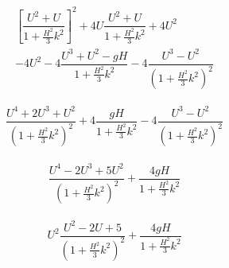 \documentclass[12pt]{article}
\begin{document}
\begin{align}
\left[\dfrac{U^2 + U}{1  + \frac{H^2}{3}k^2}\right]^2 + 4U \dfrac{U^2 + U}{1  + \frac{H^2}{3}k^2} + 4U^2 \\ -4 U^2 -4  \dfrac{U^3 + U^2 - gH}{1  + \frac{H^2}{3}k^2} - 4\dfrac{U^3 - U^2}{\left(1  + \frac{H^2}{3}k^2\right)^2} 
\end{align}


\begin{align}
\dfrac{U^4 + 2U^3 + U^2}{\left(1  + \frac{H^2}{3}k^2\right)^2}  +4  \dfrac{gH}{1  + \frac{H^2}{3}k^2} - 4\dfrac{U^3 - U^2}{\left(1  + \frac{H^2}{3}k^2\right)^2} 
\end{align}

\begin{align}
\dfrac{U^4 - 2U^3  + 5U^2}{\left(1  + \frac{H^2}{3}k^2\right)^2} +  \dfrac{4gH}{1  + \frac{H^2}{3}k^2} 
\end{align}

\begin{align}
U^2\dfrac{U^2 - 2U  + 5}{\left(1  + \frac{H^2}{3}k^2\right)^2} +  \dfrac{4gH}{1  + \frac{H^2}{3}k^2} 
\end{align}
\end{document}

